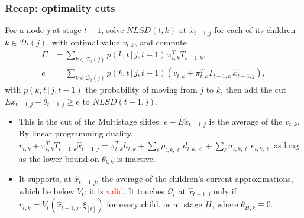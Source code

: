 \documentclass[aspectratio=169]{beamer}
\def\DD{\mathcal{D}}
\def\QQ{\mathcal{Q}}
\begin{document}
\begin{frame}
\frametitle{Recap: optimality cuts}

For a node $j$ at stage $t-1$, solve $NLSD(t,k)$ at $\hat{x}_{t-1,j}$ for each of its children
$k \in \DD_t(j)$, with optimal value $v_{t,k}$, and compute
\begin{align*}
E &= \sum\nolimits_{k \in \DD_t(j)} p(k, t\,|\,j, t - 1)\, \pi_{t,k}^T T_{t-1,k}, \\
e &= \sum\nolimits_{k \in \DD_t(j)} p(k, t\,|\,j, t - 1) \left( v_{t,k} + \pi_{t,k}^T T_{t-1,k}\, \hat{x}_{t-1,j} \right),
\end{align*}
with $p(k, t\,|\,j, t - 1)$ the probability of moving from $j$ to $k$, then add the cut
$E x_{t-1,j} + \theta_{t-1,j} \geq e$ to $NLSD(t-1,j)$.

\begin{small}
\begin{itemize}
\item
This is the cut of the Multistage slides: $e - E\hat{x}_{t-1,j}$ is the average of the $v_{t,k}$.
By linear programming duality,
$v_{t,k} + \pi_{t,k}^T T_{t-1,k} \hat{x}_{t-1,j} = \pi_{t,k}^T h_{t,k} + \sum_{\ell} \rho_{t,k,\ell}\, d_{t,k,\ell}
+ \sum_{\ell} \sigma_{t,k,\ell}\, e_{t,k,\ell}$ as long as the lower bound on $\theta_{t,k}$ is inactive.
\item
It supports, at $\hat{x}_{t-1,j}$, the average of the children's current approximations, which lie
below $V_t$: it is \textcolor{red}{valid}. It touches $\QQ_t$ at $\hat{x}_{t-1,j}$ only if
$v_{t,k} = V_t(\hat{x}_{t-1,j}, \xi_{[t]})$ for every child, as at stage $H$, where
$\theta_{H,k} \equiv 0$.
\end{itemize}
\end{small}

\end{frame}
\end{document}

